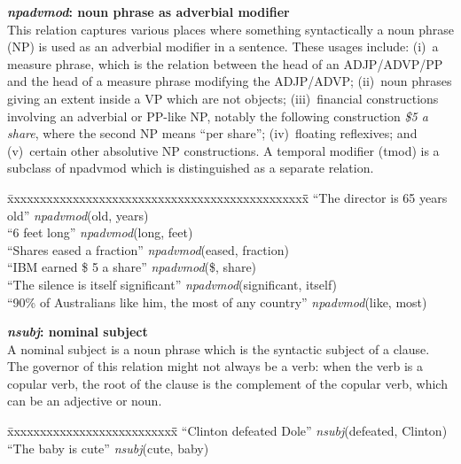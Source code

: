 \documentclass[11pt,letterpaper]{article}
\begin{document}
\noindent\textbf{\emph{npadvmod}: noun phrase as adverbial modifier}\\
This relation captures various places where something syntactically a noun phrase (NP) is used as an adverbial modifier in a sentence.   These usages include: (i)~a measure phrase, which is the relation between
the head of an ADJP/ADVP/PP and the head of a measure phrase modifying the ADJP/ADVP; (ii)~noun phrases giving an extent inside a VP which are not objects; (iii)~financial constructions involving an adverbial or PP-like NP, notably
the following construction \emph{\$5 a share}, where the second NP means ``per share''; (iv)~floating reflexives; and (v)~certain other absolutive NP constructions.
A temporal modifier (tmod) is a subclass of npadvmod which is distinguished as a separate relation.
\begin{tabbing}
\hspace{1cm} \= xxxxxxxxxxxxxxxxxxxxxxxxxxxxxxxxxxxxxxxxxxxxxx\= \hspace{.5cm}\=  \kill
\>  ``The director is 65 years old'' \> \> \emph{npadvmod}(old, years)\\
\> ``6 feet long'' \> \> \emph{npadvmod}(long, feet)\\
\> ``Shares eased a fraction'' \>\> \emph{npadvmod}(eased, fraction)\\
\> ``IBM earned \$ 5 a share'' \>\> \emph{npadvmod}(\$, share)\\
\> ``The silence is itself significant'' \>\> \emph{npadvmod}(significant, itself) \\
\>  ``90\% of Australians like him, the most of any country'' \>\> \emph{npadvmod}(like, most)
\end{tabbing}

\noindent\textbf{\emph{nsubj}: nominal subject}\\
A nominal subject is a noun phrase which is the syntactic subject of a clause. The governor of this relation might not always be a verb: when the verb is a copular verb, the root of the clause is the complement of the copular verb, which can be an adjective or noun.
\begin{tabbing}
\hspace{1cm} \= xxxxxxxxxxxxxxxxxxxxxxxxxx\= \hspace{.5cm}\=  \kill
\>  ``Clinton defeated Dole'' \> \> \emph{nsubj}(defeated, Clinton)\\
\hspace{1cm} \> ``The baby is cute'' \> \> \emph{nsubj}(cute, baby)\\
\end{tabbing}
\end{document}
